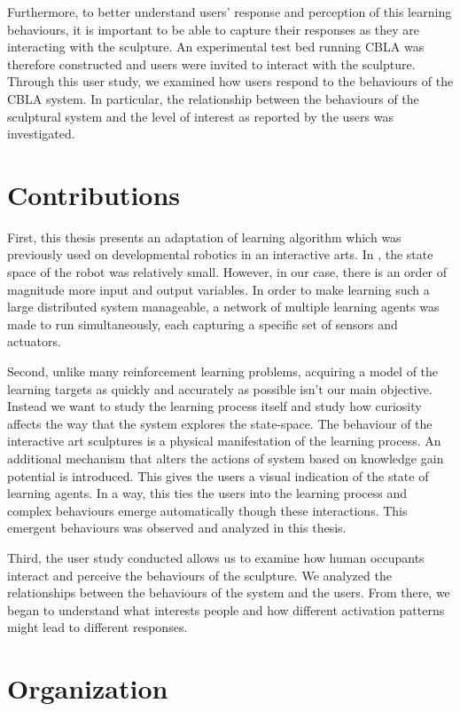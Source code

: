 Furthermore, to better understand users' response and perception of this learning behaviours, it is important to be able to capture their responses as they are interacting with the sculpture. An experimental test bed running CBLA was therefore constructed and users were invited to interact with the sculpture. Through this user study, we examined how users respond to the behaviours of the CBLA system. In particular, the relationship between the behaviours of the sculptural system and the level of interest as reported by the users was investigated. 

\section{Contributions}

First, this thesis presents an adaptation of learning algorithm which was previously used on developmental robotics in an interactive arts. In \cite{Oudeyer2007}, the state space of the robot was relatively small. However, in our case, there is an order of magnitude more input and output variables. In order to make learning such a large distributed system manageable, a network of multiple learning agents was made to run simultaneously, each capturing a specific set of sensors and actuators. 

Second, unlike many reinforcement learning problems, acquiring a model of the learning targets as quickly and accurately as possible isn't our main objective. Instead we want to study the learning process itself and study how curiosity affects the way that the system explores the state-space. The behaviour of the interactive art sculptures is a physical manifestation of the learning process. An additional mechanism that alters the actions of system based on knowledge gain potential is introduced. This gives the users a visual indication of the state of learning agents. In a way, this ties the users into the learning process and complex behaviours emerge automatically though these interactions. This emergent behaviours was observed and analyzed in this thesis.

Third, the user study conducted allows us to examine how human occupants interact and perceive the behaviours of the sculpture. We analyzed the relationships between the behaviours of the system and the users. From there, we began to understand what interests people and how different activation patterns might lead to different responses. 


\section{Organization}

